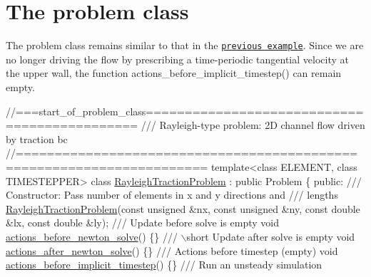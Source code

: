  

\hypertarget{index_problem}{}\section{The problem class}\label{index_problem}
The problem class remains similar to that in the \href{../../rayleigh_channel/html/index.html}{\tt previous example}. Since we are no longer driving the flow by prescribing a time-\/periodic tangential velocity at the upper wall, the function {\ttfamily actions\+\_\+before\+\_\+implicit\+\_\+timestep()} can remain empty.

 
\begin{DoxyCodeInclude}
\textcolor{comment}{//===start\_of\_problem\_class=============================================}
\textcolor{comment}{/// Rayleigh-type problem: 2D channel flow driven by traction bc}
\textcolor{comment}{}\textcolor{comment}{//======================================================================}
\textcolor{keyword}{template}<\textcolor{keyword}{class} ELEMENT, \textcolor{keyword}{class} TIMESTEPPER>
\textcolor{keyword}{class }\hyperlink{classRayleighTractionProblem}{RayleighTractionProblem} : \textcolor{keyword}{public} Problem
\{
\textcolor{keyword}{public}:
\textcolor{comment}{}
\textcolor{comment}{ /// Constructor: Pass number of elements in x and y directions and }
\textcolor{comment}{ /// lengths}
\textcolor{comment}{} \hyperlink{classRayleighTractionProblem_a6be21517d8294957f768184a2d51844a}{RayleighTractionProblem}(\textcolor{keyword}{const} \textcolor{keywordtype}{unsigned} &nx, \textcolor{keyword}{const} \textcolor{keywordtype}{unsigned} &ny, 
                 \textcolor{keyword}{const} \textcolor{keywordtype}{double} &lx, \textcolor{keyword}{const} \textcolor{keywordtype}{double} &ly);
\textcolor{comment}{}
\textcolor{comment}{ /// Update before solve is empty}
\textcolor{comment}{} \textcolor{keywordtype}{void} \hyperlink{classRayleighTractionProblem_ad8f0e846280b0dd56f90c6d40808d3ea}{actions\_before\_newton\_solve}() \{\}
\textcolor{comment}{}
\textcolor{comment}{ /// \(\backslash\)short Update after solve is empty}
\textcolor{comment}{} \textcolor{keywordtype}{void} \hyperlink{classRayleighTractionProblem_ad85c20559eec76d54ebf666f62507d2e}{actions\_after\_newton\_solve}() \{\}
\textcolor{comment}{}
\textcolor{comment}{ /// Actions before timestep (empty)}
\textcolor{comment}{} \textcolor{keywordtype}{void} \hyperlink{classRayleighTractionProblem_aea3e470265c0e98a8b5bdabedd28eb82}{actions\_before\_implicit\_timestep}() \{\}
   \textcolor{comment}{}
\textcolor{comment}{ /// Run an unsteady simulation}

\end{DoxyCodeInclude}
